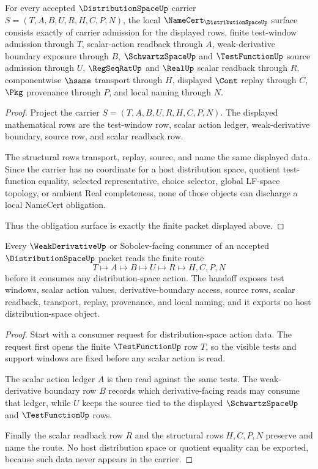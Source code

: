 \begin{theorem}
\label{thm:distribution-space-namecert-obligations}
For every accepted $\DistributionSpaceUp$ carrier $S=(T,A,B,U,R,H,C,P,N)$, the local $\NameCert_{\DistributionSpaceUp}$ surface consists exactly of carrier admission for the displayed rows, finite test-window admission through $T$, scalar-action readback through $A$, weak-derivative boundary exposure through $B$, $\SchwartzSpaceUp$ and $\TestFunctionUp$ source admission through $U$, $\RegSeqRatUp$ and $\RealUp$ scalar readback through $R$, componentwise $\hsame$ transport through $H$, displayed $\Cont$ replay through $C$, $\Pkg$ provenance through $P$, and local naming through $N$.
\end{theorem}
\begin{proof}
Project the carrier $S=(T,A,B,U,R,H,C,P,N)$. The displayed mathematical rows are the test-window row, scalar action ledger, weak-derivative boundary, source row, and scalar readback row.

The structural rows transport, replay, source, and name the same displayed data. Since the carrier has no coordinate for a host distribution space, quotient test-function equality, selected representative, choice selector, global LF-space topology, or ambient Real completeness, none of those objects can discharge a local NameCert obligation.

Thus the obligation surface is exactly the finite packet displayed above.
\end{proof}

\begin{theorem}
\label{thm:distribution-space-test-action-handoff}
Every $\WeakDerivativeUp$ or Sobolev-facing consumer of an accepted $\DistributionSpaceUp$ packet reads the finite route
$$
T \longmapsto A \longmapsto B \longmapsto U \longmapsto R \longmapsto H,C,P,N
$$
before it consumes any distribution-space action. The handoff exposes test windows, scalar action values, derivative-boundary access, source rows, scalar readback, transport, replay, provenance, and local naming, and it exports no host distribution-space object.
\end{theorem}
\begin{proof}
Start with a consumer request for distribution-space action data. The request first opens the finite $\TestFunctionUp$ row $T$, so the visible tests and support windows are fixed before any scalar action is read.

The scalar action ledger $A$ is then read against the same tests. The weak-derivative boundary row $B$ records which derivative-facing reads may consume that ledger, while $U$ keeps the source tied to the displayed $\SchwartzSpaceUp$ and $\TestFunctionUp$ rows.

Finally the scalar readback row $R$ and the structural rows $H,C,P,N$ preserve and name the route. No host distribution space or quotient equality can be exported, because such data never appears in the carrier.
\end{proof}

